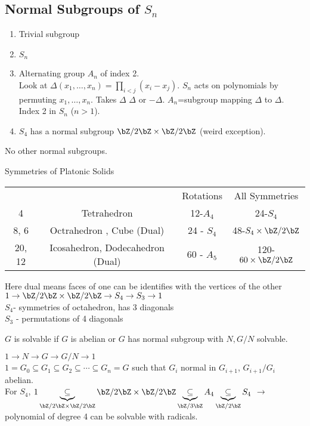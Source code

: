 
\subsection{Normal Subgroups of $S_n$} 
\begin{enumerate}
    \item Trivial subgroup 
    \item $S_n$ 
    \item Alternating group $A_n$ of index 2. \\
    Look at $\Delta(x_1, \ldots, x_n) = \prod_{i < j}(x_i-x_j)$. $S_n$ acts on polynomials by permuting $x_1, \ldots, x_n$. Takes $\Delta$ \to $\Delta$ or $-\Delta$. $A_n$=subgroup mapping $\Delta$ to $\Delta$. Index 2 in $S_n$ ($n>1$). 
    \item $S_4$ has a normal subgroup $\bZ/2\bZ \times \bZ/2\bZ$ (weird exception). 
\end{enumerate}

\noindent
No other normal subgroups. 

\noindent
Symmetries of Platonic Solids

\begin{tabular}{c c c c}
    & & Rotations & All Symmetries \\
    4 & Tetrahedron & 12-$A_4$ & 24-$S_4$ \\
    8, 6 & Octrahedron , Cube (Dual) & 24 - $S_4$ & 48-$S_4 \times \bZ/2\bZ$ \\
    20, 12 & Icosahedron, Dodecahedron (Dual) & 60 - $A_5$ & 120-$60 \times \bZ/2\bZ$ 
\end{tabular}

\noindent
Here dual means faces of one can be identifies with the vertices of the other \\

\noindent
$1 \to \bZ/2\bZ \times \bZ/2\bZ \to S_4 \to S_3 \to 1$ \\
$S_4$- symmetries of octahedron, has 3 diagonals \\
$S_3$ - permutations of 4 diagonals \\
\begin{definition}
    $G$ is solvable if $G$ is abelian or $G$ has normal subgroup with $N, G/N$ solvable. \\
\end{definition}

\noindent
$1 \to N \to G \to G/N \to 1$ \\
$1 = G_0 \subseteq G_1 \subseteq G_2 \subseteq \cdots \subseteq G_n = G$ such that $G_i$ normal in $G_{i+1}$, $G_{i+1}/G_i$ abelian. \\
For $S_4$, $1 \underbrace{\subseteq}_{\bZ/2\bZ \times \bZ/2\bZ} \bZ/2\bZ \times \bZ/2\bZ \underbrace{ \subseteq}_{\bZ/3\bZ} A_4 \underbrace{\subseteq}_{\bZ/2\bZ} S_4$ $\to$ polynomial of degree 4 can be solvable with radicals. 

